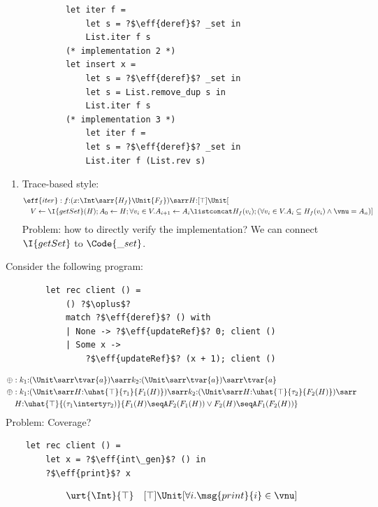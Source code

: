 \begin{example}[Iterators]
\begin{enumerate}
\begin{verbatim}
            let iter f =
                let s = ?$\eff{deref}$? _set in
                List.iter f s
            (* implementation 2 *)
            let insert x =
                let s = ?$\eff{deref}$? _set in
                let s = List.remove_dup s in
                List.iter f s
            (* implementation 3 *)
                let iter f =
                let s = ?$\eff{deref}$? _set in
                List.iter f (List.rev s)
            \end{verbatim}
            \begin{enumerate}
            \item Trace-based style:
            \begin{align*}
                & \eff{iter}: f{:} (x{:}\Int \sarr \{H_f\}\Unit\{F_f\}) \sarr H{:}[\top]{\Unit}[
                    \\&\quad  V \leftarrow \I{getSet}(H); A_0 \leftarrow H; \forall v_i \in V. A_{i{+}1} \leftarrow A_i \listconcat H_f(v_i); (\forall v_i \in V. A_i \subseteq H_f(v_i) \land \vnu = A_{n}) ]
            \end{align*}
            Problem: how to directly verify the implementation? We can connect $\I{getSet}$ to $\Code{\_set}$.
            \end{enumerate}
    \end{enumerate}
\end{example}

\begin{example}
    Consider the following program:
    \begin{verbatim}    
        let rec client () =
            () ?$\oplus$?
            match ?$\eff{deref}$? () with
            | None -> ?$\eff{updateRef}$? 0; client ()
            | Some x ->
                ?$\eff{updateRef}$? (x + 1); client ()
    \end{verbatim}
\end{example}

\begin{align*}
    & \oplus: k_1{:}(\Unit\sarr\tvar{a}) \sarr k_2{:}(\Unit\sarr\tvar{a}) \sarr \tvar{a} \\
    & \oplus: k_1{:}(\Unit\sarr H{:}\uhat{\top}{\tau_1}{F_1(H)}) \sarr k_2{:}(\Unit\sarr H{:}\uhat{\top}{\tau_2}{F_2(H)}) \sarr \\
    & \quad H{:}\uhat{\top}{(\tau_1 \interty \tau_2)}{F_1(H) \seqA F_2(F_1(H)) \lor F_2(H) \seqA F_1(F_2(H))} \\
\end{align*}\noindent
Problem: Coverage?

\begin{verbatim}    
    let rec client () =
        let x = ?$\eff{int\_gen}$? () in
        ?$\eff{print}$? x 
\end{verbatim}
\begin{align*}
    \urt{\Int}{\top} \quad  [\top]\Unit[\forall i.\msg{print}{i} \in \vnu]
\end{align*}\noindent